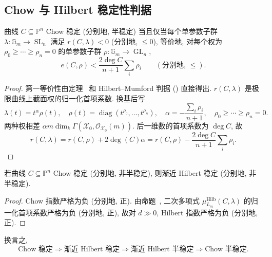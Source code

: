 \subsection{Chow 与 Hilbert 稳定性判据}\label{src:6.8.3-subsection}
\begin{proposition}\label{src:6.8.17}
曲线 $C\subseteq\mathbb P^n$ Chow 稳定 (分别地, 半稳定) 当且仅当每个单参数子群 $\lambda:\mathbb G_m\to\operatorname{SL}_n$ 满足 $r(C,\allowbreak \lambda)<0$ (分别地, $\leq0$), 等价地, 对每个权为 $\rho_0\geq\cdots\geq\rho_n=0$ 的单参数子群 $\rho:\mathbb G_m\to\operatorname{GL}_n$,
\[
e(C,\rho)<\frac{2\deg C}{n+1}\sum_i\rho_i\qquad(\text{分别地, }\leq).
\]
\end{proposition}
\begin{proof}
第一等价性由定理~ 和 Hilbert--Mumford 判据 () 直接得出. $r(C,\allowbreak \lambda)$ 是极限曲线上截面权的归一化首项系数. 换基后写
\[
\lambda(t)=t^\alpha\rho(t),\quad
\rho(t)=\operatorname{diag}(t^{\rho_0},\ldots,t^{\rho_n}),\quad
\alpha=-\frac{\sum_i\rho_i}{n+1},\quad\rho_0\geq\cdots\geq\rho_n=0.
\]
两种权相差 $\alpha m\dim_k\Gamma(\mathcal X_0,\allowbreak \mathcal O_{\mathcal X_0}(m))$. 后一维数的首项系数为 $\deg C$, 故
\[
r(C,\lambda)=r(C,\rho)+2\deg(C)\alpha
=r(C,\rho)-\frac{2\deg C}{n+1}\sum_i\rho_i.
\]
\end{proof}
\begin{proposition}\label{src:6.8.18}
若曲线 $C\subseteq\mathbb P^n$ Chow 稳定 (分别地, 非半稳定), 则渐近 Hilbert 稳定 (分别地, 非半稳定).
\end{proposition}
\begin{proof}
Chow 指数严格为负 (分别地, 正). 由命题~, 二次多项式 $\mu_{L_m}^{\mathrm{Hilb}}(C,\allowbreak \lambda)$ 的归一化首项系数严格为负 (分别地, 正), 故对 $d\gg0$, Hilbert 指数严格为负 (分别地, 正).
\end{proof}
换言之,
\[
\text{Chow 稳定}\Longrightarrow\text{渐近 Hilbert 稳定}
\Longrightarrow\text{渐近 Hilbert 半稳定}\Longrightarrow\text{Chow 半稳定}.
\]
